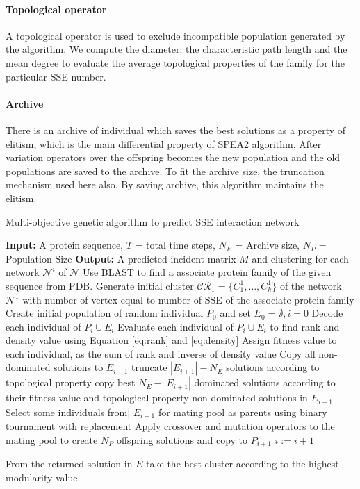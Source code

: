 \paragraph {Topological operator}
A topological operator is used to exclude incompatible population generated by the algorithm. We compute the diameter, the characteristic path length and the mean degree to evaluate the average topological properties of the family for the particular SSE number.
\paragraph {Archive}
There is an archive of individual which saves the best solutions as a property of elitism, which is the main differential property of SPEA2 algorithm. After variation operators over the offspring becomes the new population and the old populations are saved to the archive. To fit the archive size, the truncation mechanism used here also. By saving archive, this algorithm maintains the elitism.


\begin{algorithm}
\caption {Multi-objective genetic algorithm to predict SSE interaction network}
\label{alg:multiobjective}
\begin{algorithmic}[1]
\STATE \textbf{Input:} A protein sequence, $T$ = total time steps, $N_E$ = Archive size, $N_P$ = Population Size
\STATE \textbf{Output:} A predicted incident matrix $M$ and clustering for each network $\mathcal{N}^i$ of  $\mathcal{N}$
\STATE Use BLAST to find a associate protein family of the given sequence from PDB.
\STATE Generate initial cluster $\mathcal{CR}_1 = \{C_1^1,\ldots,C_k^1\}$ of the network $\mathcal{N}^1$ with number of vertex equal to number of SSE of the associate protein family
\STATE Create initial population of random individual $P_0$ and set $E_0 = \emptyset, i = 0$
\LOOP
\STATE Decode each individual of $P_i \cup E_i$
\STATE Evaluate each individual of $P_i \cup E_i$ to find rank and density value using Equation \ref{eq:rank} and \ref {eq:density}
\STATE Assign fitness value to each individual, as the sum of rank and inverse of density value
\STATE Copy all non-dominated solutions to $E_{i+1}$
\STATE truncate $|E_{i+1}| - N_E$ solutions according to topological property
\ELSE
\STATE copy best $N_E - |E_{i+1}|$ dominated solutions according to their fitness value and topological property
\ENDIF
{}
\RETURN non-dominated solutions in $E_{i+1}$
\ELSE
\STATE Select some individuals from| $E_{i+1}$ for mating pool as parents using binary tournament with replacement
\STATE Apply crossover and mutation operators to the mating pool to create $N_P$ offspring solutions and copy to $P_{i+1}$
\STATE $i:= i + 1$

\ENDIF
\ENDLOOP
\STATE From the returned solution in $E$ take the best cluster according to the highest modularity value

\ENDFOR
\end{algorithmic}
\end {algorithm}

